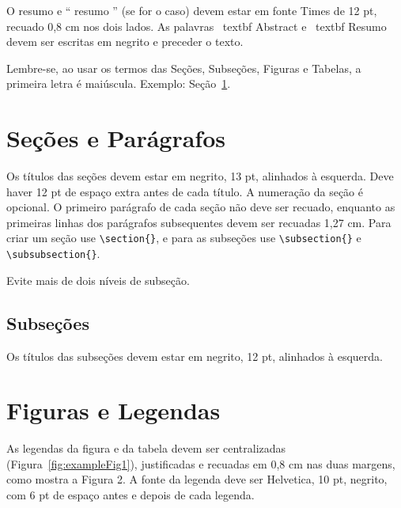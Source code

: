 \documentclass[12pt]{article}
\begin{document}
O resumo e `` resumo '' (se for o caso) devem estar em fonte Times de 12 pt, recuado 0,8 cm nos dois lados. As palavras \ textbf {Abstract} e \ textbf {Resumo} devem ser escritas em negrito e preceder o texto.

Lembre-se, ao usar os termos das Seções, Subseções, Figuras e Tabelas, a primeira letra é maiúscula. Exemplo: Seção~\ref{sec:sections-paragraphs}.

\section{Seções e Parágrafos}\label{sec:sections-paragraphs}

Os títulos das seções devem estar em negrito, 13 pt, alinhados à esquerda. Deve haver 12 pt de espaço extra antes de cada título. A numeração da seção é opcional. O primeiro parágrafo de cada seção não deve ser recuado, enquanto as primeiras linhas dos parágrafos subsequentes devem ser recuadas 1,27 cm. Para criar um seção use \verb|\section{}|, e para as subseções use \verb|\subsection{}| e \verb|\subsubsection{}|. 

Evite mais de dois níveis de subseção.

\subsection{Subseções}

Os títulos das subseções devem estar em negrito, 12 pt, alinhados à esquerda.

\section{Figuras e Legendas}\label{sec:figs}

As legendas da figura e da tabela devem ser centralizadas  (Figura~\ref{fig:exampleFig1}), justificadas e recuadas em 0,8 cm nas duas margens, como mostra a Figura 2. A fonte da legenda deve ser Helvetica, 10 pt, negrito, com 6 pt de espaço antes e depois de cada legenda.
\end{document}
